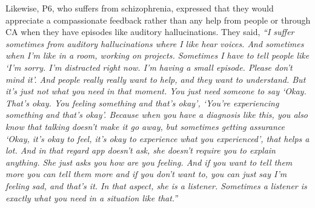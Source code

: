         Likewise, P6, who suffers from schizophrenia, expressed that they would appreciate a compassionate feedback rather than any help from people or through \ac{CA} when they have episodes like auditory hallucinations.
        They said,
                \textit{
                ``I suffer sometimes from auditory hallucinations where I like hear voices. And sometimes when I'm like in a room, working on projects. Sometimes I have to tell people like `I'm sorry. I'm distracted right now. I'm having a small episode. Please don't mind it'. And people really really want to help, and they want to understand. But it's just not what you need in that moment. You just need someone to say `Okay. That's okay. You feeling something and that's okay', `You're experiencing something and that's okay'. Because when you have a diagnosis like this, you also know that talking doesn't make it go away, but sometimes getting assurance `Okay, it's okay to feel, it's okay to experience what you experienced', that helps a lot. 
                And in that regard \acl{app} doesn't ask, she doesn't require you to explain anything. She just asks you how are you feeling. And if you want to tell them more you can tell them more and if you don't want to, you can just say I'm feeling sad, and that's it. In that aspect, she is a listener. Sometimes a listener is exactly what you need in a situation like that.''
                }
            

